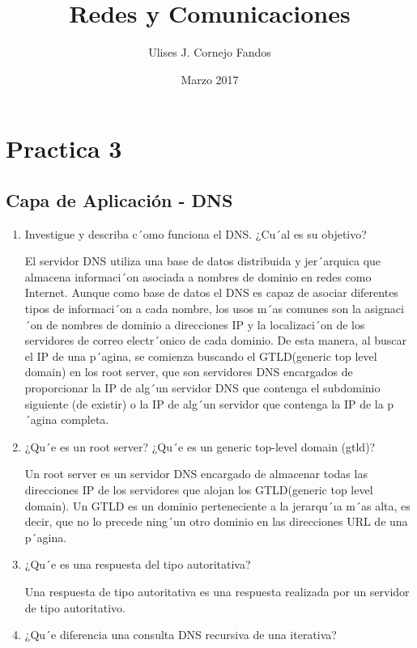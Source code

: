 \documentclass[a4paper,10pt]{article}
\title{Redes y Comunicaciones}
\author{Ulises J. Cornejo Fandos}
\date{Marzo 2017}
\begin{document}
\maketitle

\section{Practica 3}
\subsection{Capa de Aplicación - DNS}
    \begin{enumerate}
        \item  Investigue y describa c´omo funciona el DNS. ¿Cu´al es su objetivo?
        
        El servidor DNS utiliza una base de datos distribuida y jer´arquica que almacena informaci´on asociada a nombres de dominio en redes como Internet. Aunque como base de datos el DNS es capaz de asociar diferentes tipos de informaci´on a cada nombre, los usos m´as comunes son la asignaci´on de nombres de dominio a direcciones IP y la localizaci´on de los servidores de correo electr´onico de cada dominio. De esta manera, al buscar el IP de una p´agina, se comienza buscando el GTLD(generic top level domain) en los root server, que son servidores DNS encargados de proporcionar la IP de alg´un servidor DNS que contenga el subdominio siguiente (de existir) o la IP de alg´un servidor que contenga la IP de la p´agina completa.
        
        \item  ¿Qu´e es un root server? ¿Qu´e es un generic top-level domain (gtld)?
        
        Un root server es un servidor DNS encargado de almacenar todas las direcciones IP de los servidores que alojan los GTLD(generic top level domain). Un GTLD es un dominio perteneciente a la jerarqu´ıa m´as alta, es decir, que no lo precede ning´un otro dominio en las direcciones URL de una p´agina.
        
        \item  ¿Qu´e es una respuesta del tipo autoritativa?
        
        Una respuesta de tipo autoritativa es una respuesta realizada por un servidor de tipo autoritativo.
        
        \item  ¿Qu´e diferencia una consulta DNS recursiva de una iterativa?
        

\end{enumerate}
\end{document}
